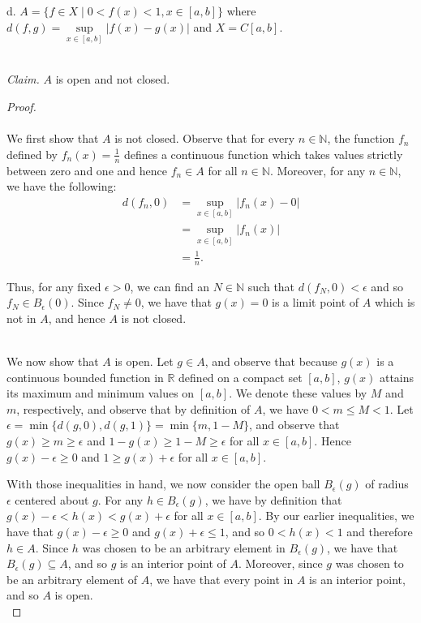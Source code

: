 \pagebreak

d.  $A = \{ f \in X \mid 0 < f(x) < 1, x \in [a, b] \}$ where $d(f, g) = \sup\limits_{x \in [a, b]}{|f(x) - g(x)|}$ and 
    $X = C[a, b]$.

\ \\
\emph{Claim.} $A$ is open and not closed. 

\begin{proof}\ \\\\
    We first show that $A$ is not closed. Observe that for every $n \in \mathbb{N}$, the function $f_n$ defined by 
    $f_n(x) = \frac{1}{n}$ defines a continuous function which takes values strictly between zero and one and hence
    $f_n \in A$ for all $n \in \mathbb{N}$. Moreover, for any $n \in \mathbb{N}$, we have the following:
    \begin{align*}
         d(f_n, 0) &= \sup\limits_{x \in [a, b]}{|f_n(x) - 0|} \\ 
                   &= \sup\limits_{x \in [a, b]}{|f_n(x)|} \\ 
                   &= \frac{1}{n}.
    \end{align*}

    Thus, for any fixed $\epsilon > 0$, we can find an $N \in \mathbb{N}$ such that $d(f_N, 0) < \epsilon$ and so 
    $f_N \in B_\epsilon(0)$. Since $f_N \neq 0$, we have that $g(x) = 0$ is a limit point of $A$ which is not in $A$, 
    and hence $A$ is not closed.

    \ \\
    We now show that $A$ is open. Let $g \in A$, and observe that because $g(x)$ is a continuous bounded function
    in $\mathbb{R}$ defined on a compact set $[a, b]$, $g(x)$ attains its maximum and minimum values on $[a, b]$. We 
    denote these values by $M$ and $m$, respectively, and observe that by definition of $A$, we have $0 < m \le M < 1$. 
    Let $\epsilon = \min{\{ d(g, 0), d(g, 1) \}} = \min{\{ m, 1 - M \}}$, and observe that $g(x) \ge m \ge \epsilon$ and 
    $1 - g(x) \ge 1 - M \ge \epsilon$ for all $x \in [a, b]$. Hence $g(x) - \epsilon \ge 0$ and $1 \ge g(x) + \epsilon$
    for all $x \in [a, b]$.

    With those inequalities in hand, we now consider the open ball $B_\epsilon(g)$ of
    radius $\epsilon$ centered about $g$. For any $h \in B_\epsilon(g)$, we have by definition that 
    $g(x) - \epsilon < h(x) < g(x) + \epsilon$ for all $x \in [a, b]$. By our earlier inequalities, we have that 
    $g(x) - \epsilon \ge 0$ and $g(x) + \epsilon \le 1$, and so $0 < h(x) < 1$ and therefore $h \in A$. Since $h$ was
    chosen to be an arbitrary element in $B_\epsilon(g)$, we have that $B_\epsilon(g) \subseteq A$, and so $g$ is an 
    interior point of $A$. Moreover, since $g$ was chosen to be an arbitrary element of $A$, we have that every point in
    $A$ is an interior point, and so $A$ is open.
    \ \\
\end{proof}


